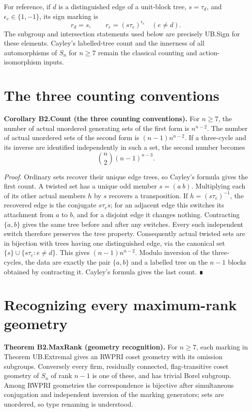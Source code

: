 For reference, if $d$ is a distinguished edge of a unit-block tree,
$s=\tau_d$, and $\epsilon_e\in\{1,-1\}$, its sign marking is
\begin{equation}
 r_d=s,\qquad r_e=(s\tau_e)^{\epsilon_e}\quad(e\ne d).
\label{eq:maximal-symmetric-markings:2-4}
\end{equation}
The subgroup and intersection statements used below are precisely
UB.Sign for these elements. Cayley's labelled-tree count and the
innerness of all automorphisms of $S_n$ for $n\geq7$ remain the
classical counting and action-isomorphism inputs.

\section{The three counting conventions}
\textbf{Corollary B2.Count (the three counting conventions).} For \(n\geq7\), the number of actual unordered generating sets of the first form is \(n^{n-2}\). The number of actual unordered sets of the second form is \((n-1)n^{n-2}\). If a three-cycle and its inverse are identified independently in such a set, the second number becomes \[
\binom n2(n-1)^{n-3}.
\]

\emph{Proof.} Ordinary sets recover their unique edge trees, so Cayley's formula gives the first count. A twisted set has a unique odd member \(s=(a\ b)\). Multiplying each of its other actual members \(h\) by \(s\) recovers a transposition. If \(h=(s\tau_e)^{-1}\), the recovered edge is the conjugate \(s\tau_es\); for an adjacent edge this switches its attachment from \(a\) to \(b\), and for a disjoint edge it changes nothing. Contracting \(\{a,b\}\) gives the same tree before and after any switches. Every such independent switch therefore preserves the tree property. Consequently actual twisted sets are in bijection with trees having one distinguished edge, via the canonical set \(\{s\}\cup\{s\tau_e:e\ne d\}\). This gives \((n-1)n^{n-2}\). Modulo inversion of the three-cycles, the data are exactly the pair \(\{a,b\}\) and a labelled tree on the \(n-1\) blocks obtained by contracting it. Cayley's formula gives the last count. ∎
\section{Recognizing every maximum-rank geometry}
\textbf{Theorem B2.MaxRank (geometry recognition).} For \(n\geq7\), each marking in Theorem UB.Extremal gives an RWPRI coset geometry with its omission subgroups. Conversely every firm, residually connected, flag-transitive coset geometry of \(S_n\) of rank \(n-1\) is one of these, and has trivial Borel subgroup. Among RWPRI geometries the correspondence is bijective after simultaneous conjugation and independent inversion of the marking generators; sets are unordered, so type renaming is understood.

